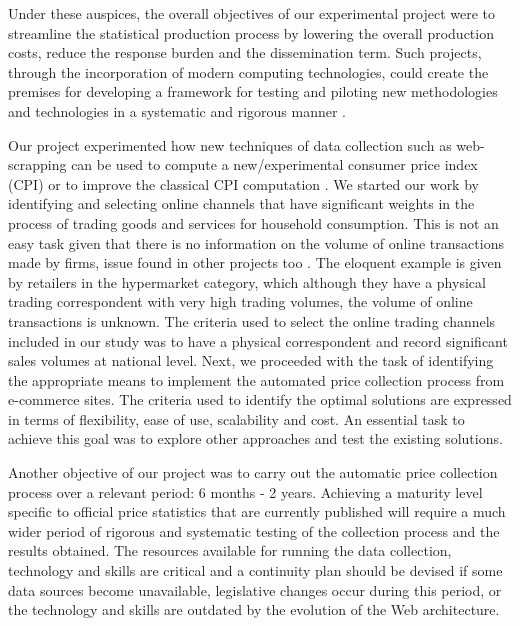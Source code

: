 \documentclass[]{article}
\begin{document}
Under these auspices, the overall objectives of our experimental project were to streamline the statistical production process by 
lowering the overall production costs, reduce the response burden and the dissemination term. Such projects, through the incorporation 
of modern computing technologies, could create the premises for developing a framework for testing and piloting new methodologies 
and technologies in a systematic and rigorous manner \cite{ons2017}. 


Our project experimented how new techniques of data collection such as web-scrapping can be used to compute a new/experimental 
consumer price index (CPI) or to improve the classical CPI computation \cite{otawa2017}. We started our work by identifying and 
selecting online channels that have significant weights in the process of trading goods and services for household consumption. 
This is not an easy task given that there is no information on the volume of online transactions made by firms, 
issue found in other projects too \cite{willenborg2017}. The eloquent 
example is given by retailers in the hypermarket category, which although they have a physical trading correspondent with very high 
trading volumes, the volume of online transactions is unknown. The criteria used to select the online trading channels included in 
our study was to have a physical correspondent and record significant sales volumes at national level. Next, we proceeded with the 
task of identifying the appropriate means to implement the automated price collection process from e-commerce sites. The criteria 
used to identify the optimal solutions are expressed in terms of flexibility, ease of use, scalability and cost. An essential task 
to achieve this goal was to explore other approaches and test the existing solutions. 



Another objective of our project was to carry out the automatic price collection process over a relevant period: 6 months - 2 years. 
Achieving a maturity level specific to official price statistics that are currently published will require a much wider period of 
rigorous and systematic testing of the collection process and the results obtained. The resources available for running the data 
collection, technology and skills are critical and a continuity plan should be devised if some data sources become unavailable, 
legislative changes occur during this period, or the technology and skills are outdated by the evolution of the Web architecture. 
\end{document}

